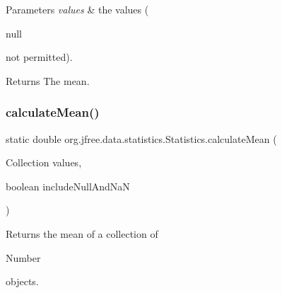 \begin{DoxyParams}{Parameters}
{\em values} & the values (
\begin{DoxyCode}
null 
\end{DoxyCode}
 not permitted).\\
\hline
\end{DoxyParams}
\begin{DoxyReturn}{Returns}
The mean. 
\end{DoxyReturn}
\mbox{\label{classorg_1_1jfree_1_1data_1_1statistics_1_1_statistics_ad7edaf335d8f7fe9ce148b02dc317cd6}} 
\subsubsection{\texorpdfstring{calculate\+Mean()}{calculateMean()}\hspace{0.1cm}{\footnotesize\ttfamily [4/4]}}
{\footnotesize\ttfamily static double org.\+jfree.\+data.\+statistics.\+Statistics.\+calculate\+Mean (\begin{DoxyParamCaption}\item[{Collection}]{values,  }\item[{boolean}]{include\+Null\+And\+NaN }\end{DoxyParamCaption})\hspace{0.3cm}{\ttfamily [static]}}

Returns the mean of a collection of
\begin{DoxyCode}
Number 
\end{DoxyCode}
 objects.


